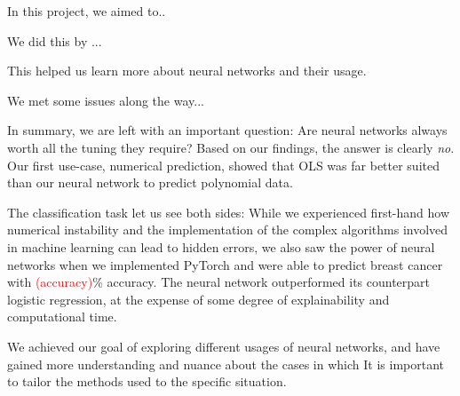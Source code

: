 In this project, we aimed to..

We did this by ...

This helped us learn more about neural networks and their usage.

We met some issues along the way...

In summary, we are left with an important question: Are neural networks always worth all the tuning they require? Based on our findings, the answer is clearly \emph{no}. Our first use-case, numerical prediction, showed that OLS was far better suited than our neural network to predict polynomial data. 

The classification task let us see both sides: While we experienced first-hand how numerical instability and the implementation of the complex algorithms involved in machine learning can lead to hidden errors, we also saw the power of neural networks when we implemented PyTorch and were able to predict breast cancer with \textcolor{red}{(accuracy)}\% accuracy. The neural network outperformed its counterpart logistic regression, at the expense of some degree of explainability and computational time. 

We achieved our goal of exploring different usages of neural networks, and have gained more understanding and nuance about the cases in which 
It is important to tailor the methods used to the specific situation.